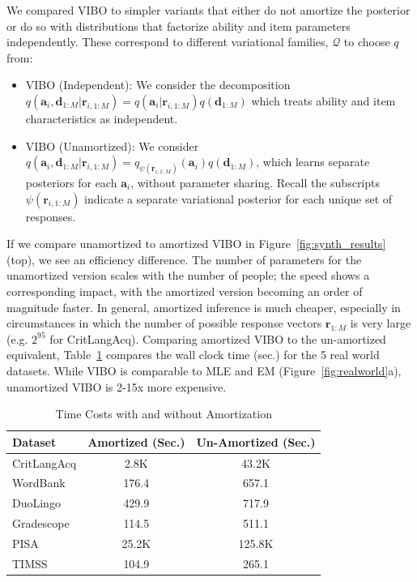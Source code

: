 We compared VIBO to simpler variants that either do not amortize the posterior or do so with distributions that factorize ability and item parameters independently. These correspond to different variational families, $\mathcal{Q}$ to choose $q$ from:
\begin{itemize}
\item VIBO (Independent): We consider the decomposition $q(\mathbf{a}_i, \mathbf{d}_{1:M}|\mathbf{r}_{i,1:M}) = q(\mathbf{a}_i|\mathbf{r}_{i,1:M})q(\mathbf{d}_{1:M})$ which treats ability and item characteristics as independent.
\item VIBO (Unamortized): We consider $q(\mathbf{a}_i, \mathbf{d}_{1:M}|\mathbf{r}_{i,1:M}) = q_{\psi(\mathbf{r}_{i,1:M})}(\mathbf{a}_i)q(\mathbf{d}_{1:M})$, which learns separate posteriors for each $\mathbf{a}_i$, without parameter sharing.
Recall the subscripts $\psi(\mathbf{r}_{i,1:M})$ indicate a separate variational posterior for each unique set of responses.
\end{itemize}
If we compare unamortized to amortized VIBO in Figure~\ref{fig:synth_results} (top), we see an efficiency difference.
The number of parameters for the unamortized version scales with the number of people; the speed shows a corresponding impact, with the amortized version becoming an order of magnitude faster.
In general, amortized inference is much cheaper, especially in circumstances in which the number of possible response vectors $\mathbf{r}_{1:M}$ is very large (e.g. $2^{95}$ for CritLangAcq).
Comparing amortized VIBO to the un-amortized equivalent, Table~\ref{table:amortization:timing} compares the wall clock time (sec.) for the 5 real world datasets.
While VIBO is comparable to MLE and EM (Figure~\ref{fig:realworld}a), unamortized VIBO is 2-15x more expensive.

\begin{table}[h!]
    \caption{Time Costs with and without Amortization}
    \label{table:amortization:timing}
    \begin{center}
    \begin{tabular}{lcc}
    \hline
    Dataset & Amortized (Sec.) & Un-Amortized (Sec.) \\
    \hline
    CritLangAcq & 2.8K & 43.2K \\
    WordBank & 176.4 & 657.1 \\
    DuoLingo & 429.9 & 717.9 \\
    Gradescope & 114.5 & 511.1 \\
    PISA & 25.2K & 125.8K \\
    TIMSS & 104.9 & 265.1 \\
    \hline
    \end{tabular}
    \end{center}
\end{table}


